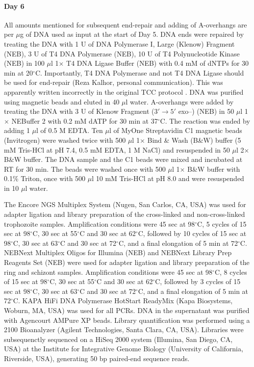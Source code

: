 \documentclass{article}
\begin{document}
\paragraph{Day 6}
All amounts mentioned for subsequent end-repair and adding of
A-overhangs are per $\mu$g of DNA used as input at the start of Day 5. DNA
ends were repaired by treating the DNA with 1 U of DNA Polymerase I,
Large (Klenow) Fragment (NEB), 3 U of T4 DNA Polymerase (NEB), 10 U of
T4 Polynucleotide Kinase (NEB) in 100 $\mu$l 1$\times$ T4 DNA Ligase Buffer (NEB)
with 0.4 mM of dNTPs for 30 min at 20$^\circ$C. Importantly, T4 DNA
Polymerase and not T4 DNA Ligase should be used for end-repair (Reza
Kalhor, personal communication). This was apparently written
incorrectly in the original TCC protocol \cite{kalhor:genome}. DNA was purified using
magnetic beads and eluted in 40 $\mu$l water. A-overhangs were added by
treating the DNA with 3 U of Klenow Fragment ($3' \rightarrow 5'$ exo--) (NEB) in 50
$\mu$l 1$\times$ NEBuffer 2 with 0.2 mM dATP for 30 min at 37$^\circ$C. The reaction was
ended by adding 1 $\mu$l of 0.5 M EDTA. Ten $\mu$l of MyOne Streptavidin C1
magnetic beads (Invitrogen) were washed twice with 500 $\mu$l 1$\times$ Bind \&
Wash (B\&W) buffer (5 mM Tris-HCl at pH 7.4, 0.5 mM EDTA, 1 M NaCl)
and resuspended in 50 $\mu$l 2$\times$ B\&W buffer. The DNA sample  and the C1
beads were mixed and incubated at RT for 30 min. The beads were washed
once with 500 $\mu$l 1$\times$ B\&W buffer with 0.1\% Triton, once with 500 $\mu$l 10
mM Tris-HCl at pH 8.0 and were resuspended in 10 $\mu$l water.

The Encore NGS Multiplex System (Nugen, San Carlos, CA, USA) was used
for adapter ligation and library preparation of the cross-linked and
non-cross-linked trophozoite samples. Amplification conditions were 45
sec at 98$^\circ$C, 5 cycles of 15 sec at 98$^\circ$C, 30 sec at 55$^\circ$C and 30 sec at
62$^\circ$C, followed by 10 cycles of 15 sec at 98$^\circ$C, 30 sec at 63$^\circ$C and 30
sec at 72$^\circ$C, and a final elongation of 5 min at 72$^\circ$C. NEBNext
Multiplex Oligos for Illumina (NEB) and NEBNext Library Prep Reagents
Set (NEB) were used for adapter ligation and library preparation of
the ring and schizont samples. Amplification conditions were 45 sec at
98$^\circ$C, 8 cycles of 15 sec at 98$^\circ$C, 30 sec at 55$^\circ$C and 30 sec at 62$^\circ$C,
followed by 3 cycles of 15 sec at 98$^\circ$C, 30 sec at 63$^\circ$C and 30 sec at
72$^\circ$C, and a final elongation of 5 min at 72$^\circ$C. KAPA HiFi DNA
Polymerase HotStart ReadyMix (Kapa Biosystems, Woburn, MA, USA) was
used for all PCRs. DNA in the supernatant was purified with Agencourt
AMPure XP beads. Library quantification was performed using a 2100
Bioanalyzer (Agilent Technologies, Santa Clara, CA, USA). Libraries
were subsequenctly sequenced on a HiSeq 2000 system (Illumina, San
Diego, CA, USA) at the Institute for Integrative Genome Biology
(University of California, Riverside, USA), generating 50 bp
paired-end sequence reads.
\end{document}
